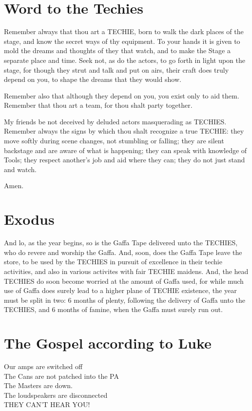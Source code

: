 \documentclass[10pt,a4paper,oneside]{article}
\begin{document}
\section{Word to the Techies}
Remember always that thou art a TECHIE, born to walk the dark places of the stage, and know the secret ways of thy equipment. To your hands it is given to mold the dreams and thoughts of they that watch, and to make the Stage a separate place and time. Seek not, as do the actors, to go forth in light upon the stage, for though they strut and talk and put on airs, their craft does truly depend on you, to shape the dreams that they would show. 

Remember also that although they depend on you, you exist only to aid them. Remember that thou art a team, for thou shalt party together. 

My friends be not deceived by deluded actors masquerading as TECHIES. Remember always the signs by which thou shalt recognize a true TECHIE: they move softly during scene changes, not stumbling or falling; they are silent backstage and are aware of what is happening; they can speak with knowledge of Tools; they respect another's job and aid where they can; they do not just stand and watch.

Amen.

\section{Exodus}
And lo, as the year begins, so is the Gaffa Tape delivered unto the TECHIES, who do revere and worship the Gaffa. And, soon, does the Gaffa Tape leave the store, to be used by the TECHIES in pursuit of excellence in their techie activities, and also in various activites with fair TECHIE maidens. And, the head TECHIES do soon become worried at the amount of Gaffa used, for while much use of Gaffa does surely lead to a higher plane of TECHIE existence, the year must be split in two: 6 months of plenty, following the delivery of Gaffa unto the TECHIES, and 6 months of famine, when the Gaffa must surely run out.

\section{The Gospel according to Luke}
Our amps are switched off \\
The Cans are not patched into the PA \\
The Masters are down. \\
The loudspeakers are disconnected \\
THEY CAN'T HEAR YOU!\\
\end{document}

